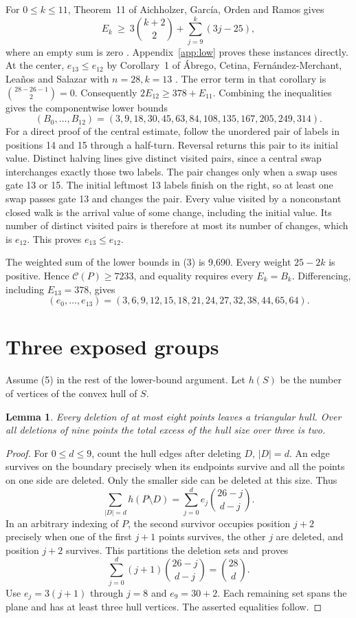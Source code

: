 \documentclass[11pt]{article}
\newtheorem{lemma}[theorem]{Lemma}
\newcommand{\Cr}{\mathcal C}
\begin{document}
For \(0\le k\le11\), Theorem~11 of Aichholzer, García, Orden and Ramos gives
\[
 E_k\ \ge\ 3\binom{k+2}{2}+\sum_{j=9}^{k}(3j-25),                \tag{4}
\]
where an empty sum is zero \cite{aich}. Appendix~\ref{app:low} proves these instances directly. At the center, \(e_{13}\le e_{12}\) by Corollary~1 of Ábrego, Cetina, Fernández-Merchant, Leaños and Salazar with \(n=28,k=13\) \cite{abregolower}. The error term in that corollary is \(\binom{28-26-1}{2}=0\). Consequently \(2E_{12}\ge378+E_{11}\). Combining the inequalities gives the componentwise lower bounds
\[
 (B_0,\ldots,B_{12})=(3,9,18,30,45,63,84,108,135,167,205,249,314).
\]
For a direct proof of the central estimate, follow the unordered pair of labels in positions 14 and 15 through a half-turn. Reversal returns this pair to its initial value. Distinct halving lines give distinct visited pairs, since a central swap interchanges exactly those two labels. The pair changes only when a swap uses gate 13 or 15. The initial leftmost 13 labels finish on the right, so at least one swap passes gate 13 and changes the pair. Every value visited by a nonconstant closed walk is the arrival value of some change, including the initial value. Its number of distinct visited pairs is therefore at most its number of changes, which is \(e_{12}\). This proves \(e_{13}\le e_{12}\).

The weighted sum of the lower bounds in (3) is 9,690. Every weight \(25-2k\) is positive. Hence \(\Cr(P)\ge7233\), and equality requires every \(E_k=B_k\). Differencing, including \(E_{13}=378\), gives
\[
 (e_0,\ldots,e_{13})=(3,6,9,12,15,18,21,24,27,32,38,44,65,64). \tag{5}
\]

\section{Three exposed groups}
Assume (5) in the rest of the lower-bound argument. Let \(h(S)\) be the number of vertices of the convex hull of \(S\).
\begin{lemma}
Every deletion of at most eight points leaves a triangular hull. Over all deletions of nine points the total excess of the hull size over three is two.
\end{lemma}
\begin{proof}
For \(0\le d\le9\), count the hull edges after deleting \(D\), \(|D|=d\). An edge survives on the boundary precisely when its endpoints survive and all the points on one side are deleted. Only the smaller side can be deleted at this size. Thus
\[
 \sum_{|D|=d} h(P\setminus D)=\sum_{j=0}^{d}e_j\binom{26-j}{d-j}.
\]
In an arbitrary indexing of \(P\), the second survivor occupies position \(j+2\) precisely when one of the first \(j+1\) points survives, the other \(j\) are deleted, and position \(j+2\) survives. This partitions the deletion sets and proves
\[
 \sum_{j=0}^{d}(j+1)\binom{26-j}{d-j}=\binom{28}{d}.
\]
Use \(e_j=3(j+1)\) through \(j=8\) and \(e_9=30+2\). Each remaining set spans the plane and has at least three hull vertices. The asserted equalities follow.
\end{proof}
\end{document}
